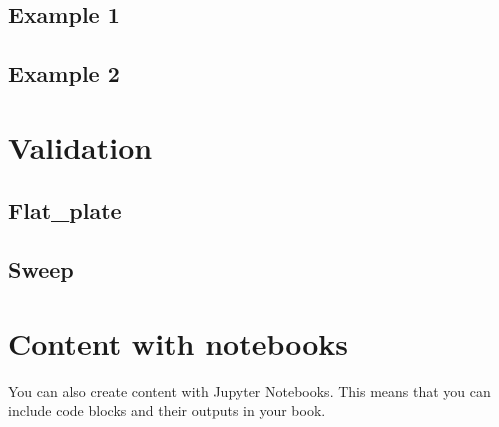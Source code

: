 \documentclass[letterpaper,10pt,english]{jupyterBook}
\begin{document}
\section{Example 1}
\label{\detokenize{chapters/example1:example-1}}\label{\detokenize{chapters/example1::doc}}
\sphinxstepscope


\section{Example 2}
\label{\detokenize{chapters/example2:example-2}}\label{\detokenize{chapters/example2::doc}}
\sphinxstepscope


\chapter{Validation}
\label{\detokenize{chapters/validation:validation}}\label{\detokenize{chapters/validation::doc}}
\sphinxstepscope


\section{Flat\_plate}
\label{\detokenize{chapters/flat_plate:flat-plate}}\label{\detokenize{chapters/flat_plate::doc}}
\sphinxstepscope


\section{Sweep}
\label{\detokenize{chapters/sweep:sweep}}\label{\detokenize{chapters/sweep::doc}}
\sphinxstepscope


\chapter{Content with notebooks}
\label{\detokenize{chapters/notebooks:content-with-notebooks}}\label{\detokenize{chapters/notebooks::doc}}
\sphinxAtStartPar
You can also create content with Jupyter Notebooks. This means that you can include
code blocks and their outputs in your book.
\end{document}
